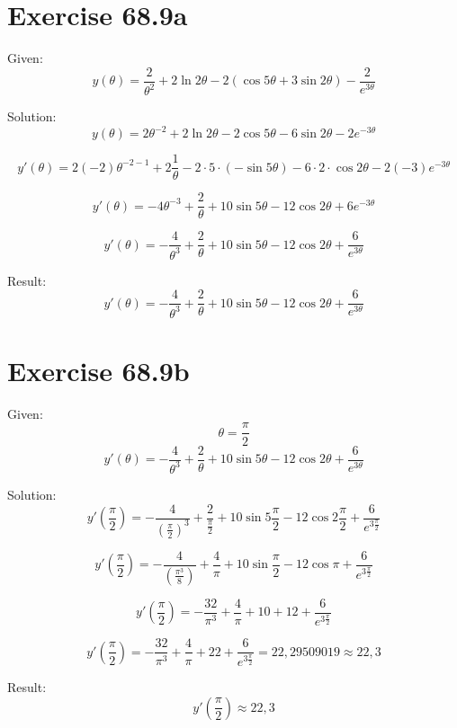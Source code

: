 \documentclass[a4paper, 10pt]{scrartcl}
\begin{document}
\section{Exercise 68.9a}

Given:
\[y(\theta) = \frac{2}{\theta^{2}} + 2\ln{2\theta} -
              2(\cos{5\theta} + 3\sin{2\theta}) - \frac{2}{e^{3\theta}}\]

Solution:
\[y(\theta) = 2\theta^{-2} + 2\ln{2\theta} -
              2\cos{5\theta} - 6\sin{2\theta} - 2e^{-3\theta}\]

\[y'(\theta) = 2(-2)\theta^{-2 - 1} + 2\frac{1}{\theta} -
              2\cdot5\cdot(-\sin{5\theta}) - 6\cdot2\cdot \cos{2\theta} - 2(-3)e^{-3\theta}\]

\[y'(\theta) = -4\theta^{-3} + \frac{2}{\theta} +
              10\sin{5\theta} - 12\cos{2\theta} + 6e^{-3\theta}\]

\[y'(\theta) = -\frac{4}{\theta^{3}} + \frac{2}{\theta} +
              10\sin{5\theta} - 12\cos{2\theta} + \frac{6}{e^{3\theta}}\]

Result:
\[y'(\theta) = -\frac{4}{\theta^{3}} + \frac{2}{\theta} +
              10\sin{5\theta} - 12\cos{2\theta} + \frac{6}{e^{3\theta}}\]

\section{Exercise 68.9b}

Given:
\[\theta = \frac{\pi}{2}\]
\[y'(\theta) = -\frac{4}{\theta^{3}} + \frac{2}{\theta} +
              10\sin{5\theta} - 12\cos{2\theta} + \frac{6}{e^{3\theta}}\]

Solution:
\[y'(\frac{\pi}{2}) = -\frac{4}{(\frac{\pi}{2})^{3}} + \frac{2}{\frac{\pi}{2}} +
              10\sin{5\frac{\pi}{2}} - 12\cos{2\frac{\pi}{2}} + \frac{6}{e^{3\frac{\pi}{2}}}\]

\[y'(\frac{\pi}{2}) = -\frac{4}{(\frac{\pi^{3}}{8})} + \frac{4}{\pi} +
              10\sin{\frac{\pi}{2}} - 12\cos{\pi} + \frac{6}{e^{3\frac{\pi}{2}}}\]

\[y'(\frac{\pi}{2}) = -\frac{32}{\pi^{3}} + \frac{4}{\pi} +
              10 + 12 + \frac{6}{e^{3\frac{\pi}{2}}}\]

\[y'(\frac{\pi}{2}) = -\frac{32}{\pi^{3}} + \frac{4}{\pi} +
              22 + \frac{6}{e^{3\frac{\pi}{2}}} = 22,29509019 \approx 22,3 \]

Result:
\[y'(\frac{\pi}{2}) \approx 22,3\]
\end{document}
